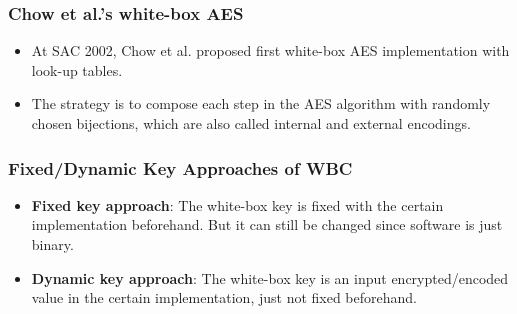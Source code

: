 \documentclass{beamer}
\begin{document}
\frame
{
\frametitle{Chow et al.'s white-box AES}
\begin{itemize}
\item At SAC 2002, Chow et al. proposed first white-box AES implementation with look-up tables.
\item The strategy is to compose each step in the AES algorithm with randomly chosen bijections, which are also called \textcolor[rgb]{1.00,0.00,0.00}{internal and external encodings}.
\end{itemize}

\begin{center}
\end{center}
}

\frame
{
\frametitle{Fixed/Dynamic Key Approaches of WBC}

\begin{itemize}
\item \textbf{Fixed key approach}: The white-box key is fixed with the certain implementation beforehand. \textcolor[rgb]{1.00,0.00,0.00}{But it can still be changed since software is just binary.}

\item \textbf{Dynamic key approach}: The white-box key is an input encrypted/encoded value in the certain implementation, just not fixed beforehand.
\end{itemize}
}
\end{document}
